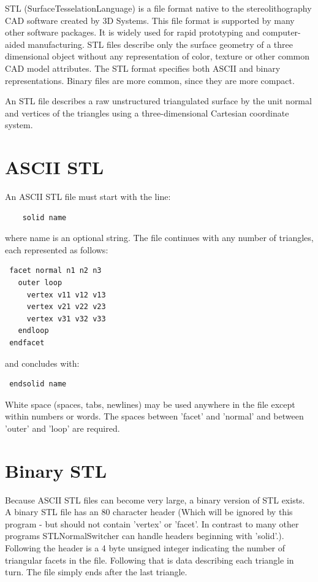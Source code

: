 STL (SurfaceTesselationLanguage) is a file format native to the stereolithography CAD software created by 3D Systems. This file format is supported by many other software packages. It is widely used for rapid prototyping and computer-aided manufacturing. STL files describe only the surface geometry of a three dimensional object without any representation of color, texture or other common CAD model attributes. The STL format specifies both ASCII and binary representations. Binary files are more common, since they are more compact.

An STL file describes a raw unstructured triangulated surface by the unit normal and vertices of the triangles using a three-dimensional Cartesian coordinate system.


\section{ASCII STL}

An ASCII STL file must start with the line:

\begin{verbatim}
	solid name
\end{verbatim}

\noindent
where name is an optional string. The file continues with any number of triangles, each represented as follows:
\begin{verbatim}
 facet normal n1 n2 n3
   outer loop
     vertex v11 v12 v13
     vertex v21 v22 v23
     vertex v31 v32 v33
   endloop
 endfacet
\end{verbatim}

\noindent
and concludes with:

\begin{verbatim}
 endsolid name
\end{verbatim}

\noindent
White space (spaces, tabs, newlines) may be used anywhere in the file except within numbers or words. The spaces between 'facet' and 'normal' and between 'outer' and 'loop' are required.


\section{Binary STL}

Because ASCII STL files can become very large, a binary version of STL  exists. A binary STL file has an 80 character header (Which will be ignored by this program - but should not contain 'vertex' or 'facet'. In contrast to many other programs STLNormalSwitcher can handle headers beginning with 'solid'.). Following the header is a 4 byte unsigned integer indicating the number of triangular facets in the file. Following that is data describing each triangle in turn. The file simply ends after the last triangle.\\

